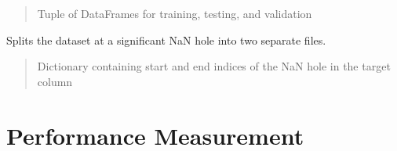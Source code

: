 \documentclass[letterpaper,10pt,english]{sphinxmanual}
\begin{document}
\begin{fulllineitems}
\begin{fulllineitems}
\begin{quote}
\begin{description}
\sphinxAtStartPar
Tuple of DataFrames for training, testing, and validation

\end{description}\end{quote}

\end{fulllineitems}


\begin{fulllineitems}
\label{\detokenize{docs/data_preprocessing:data_preprocessing.DataPreprocessor.split_file_at_nanhole}}
\pysigstartsignatures
{}
\pysigstopsignatures
\sphinxAtStartPar
Splits the dataset at a significant NaN hole into two separate files.
\begin{quote}\begin{description}
\sphinxAtStartPar
{} \textendash{} Dictionary containing start and end indices of the NaN hole in the target column

\end{description}\end{quote}

\end{fulllineitems}


\end{fulllineitems}


\sphinxstepscope


\section{Performance Measurement}
\label{\detokenize{docs/performance_measurement:performance-measurement}}\label{\detokenize{docs/performance_measurement::doc}}\label{\detokenize{docs/performance_measurement:module-performance_measurement}}
\end{document}
